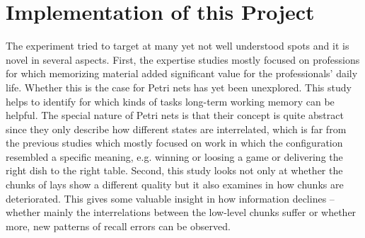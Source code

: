 \section{Implementation of this Project}

The experiment tried to target at many yet not well understood spots and it is novel in several aspects.
First, the expertise studies mostly focused on professions for which memorizing material added significant value for the professionals' daily life\parencites(cf.)(){oulasvirta2006surviving}.
Whether this is the case for Petri nets has yet been unexplored.
This study helps to identify for which kinds of tasks long-term working memory can be helpful.
The special nature of Petri nets is that their concept is quite abstract since they only describe how different states are interrelated, which is far from the previous studies which mostly focused on work in which the configuration resembled a specific meaning, e.g. winning or loosing a game or delivering the right dish to the right table.
Second, this study looks not only at whether the chunks of lays show a different quality but it also examines in how chunks are deteriorated.
This gives some valuable insight in how information declines -- whether mainly the interrelations between the low-level chunks suffer \parencites(cf.)(){moss2006role} or whether more, new patterns of recall errors can be observed.
